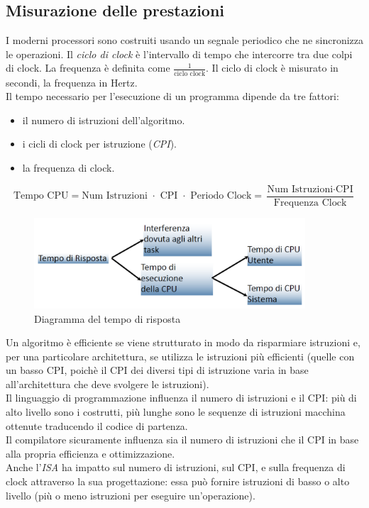 \documentclass[class=book, crop=false]{standalone}
\begin{document}
\subsection{Misurazione delle prestazioni}
I moderni processori sono costruiti usando un segnale periodico che ne sincronizza le operazioni. Il \emph{ciclo di clock} è l’intervallo di tempo che intercorre tra due colpi di clock. La frequenza è definita come $\frac{1}{\text{ciclo clock}}$. Il ciclo di clock è misurato in secondi, la frequenza in Hertz.\\

Il tempo necessario per l'esecuzione di un programma dipende da tre fattori:
\begin{itemize}[nolistsep]
	\item il numero di istruzioni dell'algoritmo.
	\item i cicli di clock per istruzione (\emph{CPI}).
	\item la frequenza di clock.
\end{itemize}
\begin{equation*}
\text{Tempo CPU} = \text{Num Istruzioni } \cdot \text{ CPI } \cdot \text{ Periodo Clock} = \frac{\text{Num Istruzioni} \cdot \text{CPI}}{\text{Frequenza Clock}}
\end{equation*}

\begin{figure}[H]
	\centering
	\includegraphics[width=0.9\textwidth,keepaspectratio]{tempo_risposta.png}
	\caption{Diagramma del tempo di risposta}
\end{figure}
Un algoritmo è efficiente se viene strutturato in modo da risparmiare istruzioni e, per una particolare architettura, se utilizza le istruzioni più efficienti (quelle con un basso CPI, poichè il CPI dei diversi tipi di istruzione varia in base all'architettura che deve svolgere le istruzioni).\\
Il linguaggio di programmazione influenza il numero di istruzioni e il CPI: più di alto livello sono i costrutti, più lunghe sono le sequenze di istruzioni macchina ottenute traducendo il codice di partenza.\\
Il compilatore sicuramente influenza sia il numero di istruzioni che il CPI in base alla propria efficienza e ottimizzazione.\\
Anche l'\emph{ISA} ha impatto sul numero di istruzioni, sul CPI, e sulla frequenza di clock attraverso la sua progettazione: essa può fornire istruzioni di basso o alto livello (più o meno istruzioni per eseguire un'operazione).
\end{document}
